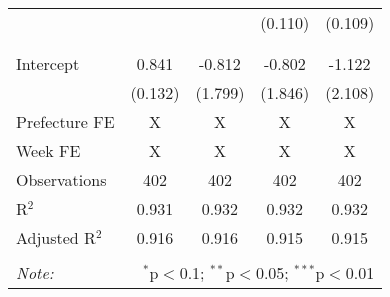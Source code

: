 \begin{table}[!htbp]
\begin{tabular}{@{\extracolsep{5pt}}lcccc}
  &  &  & (0.110) & (0.109) \\ 
  & & & & \\ 
\hline \\[-1.8ex] 
Intercept & 0.841 & -0.812 & -0.802 & -1.122 \\ 
 & (0.132) & (1.799) & (1.846) & (2.108) \\ 
Prefecture FE & X & X & X & X \\ 
Week FE & X & X & X & X \\ 
Observations & 402 & 402 & 402 & 402 \\ 
R$^{2}$ & 0.931 & 0.932 & 0.932 & 0.932 \\ 
Adjusted R$^{2}$ & 0.916 & 0.916 & 0.915 & 0.915 \\ 
\hline 
\hline \\[-1.8ex] 
\textit{Note:}  & \multicolumn{4}{r}{$^{*}$p$<$0.1; $^{**}$p$<$0.05; $^{***}$p$<$0.01} \\ 
\end{tabular} 
\end{table} 
